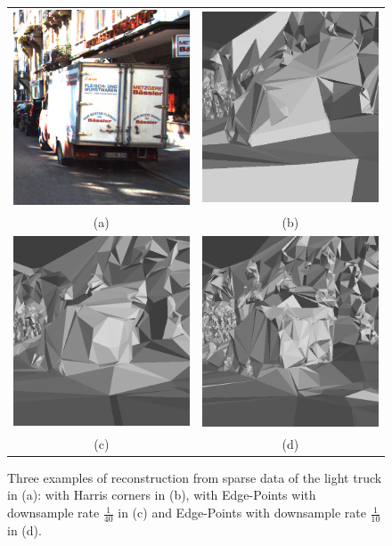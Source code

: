 \begin{figure}
\begin{center}
\begin{tabular}{cc}
\centering
\includegraphics[width=0.33\columnwidth]{./img//imageOrig}&
\includegraphics[width=0.33\columnwidth]{./img//notedge}\\
(a) & (b)\\
\includegraphics[width=0.33\columnwidth]{./img//edge40}&
\includegraphics[width=0.33\columnwidth]{./img//edge10}\\
(c) & (d)\\
\end{tabular}
\end{center}
\caption{Three examples of reconstruction from sparse data of the light truck in (a): with Harris corners in (b), with Edge-Points with downsample rate  $\frac{1}{40}$  in (c)  and Edge-Points with  downsample rate  $\frac{1}{10}$ in (d).}
\label{fig:reconstrEx}
\end{figure}


